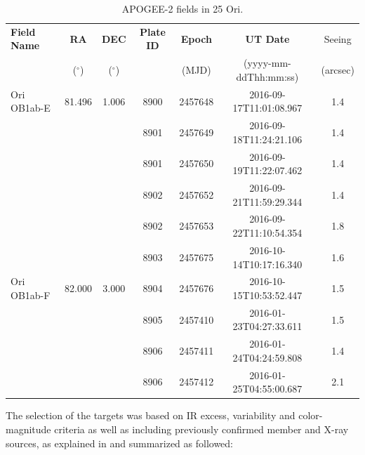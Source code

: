 \documentclass[12pt]{article}
\newcounter{subsubsubsection}[subsubsection]
\begin{document}
\begin{table} \tiny
\begin{center}
 \caption{APOGEE-2 fields in 25 Ori.}
 \label{tab:APOGEE-2_fields}
 \begin{threeparttable}
  	\setlength{\tabcolsep}{11pt}
	\begin{tabular}{lcccccc}
	\toprule
	{\bf Field Name} & {\bf RA}    & {\bf DEC}  & {\bf Plate ID} & {\bf Epoch} & {\bf UT Date}         & Seeing   \\
	                 & ($^\circ$) & ($^\circ$)  &                & (MJD)       & (yyyy-mm-ddThh:mm:ss) & (arcsec) \\
	\midrule
	Ori OB1ab-E & 81.496 & 1.006 & 8900 & 2457648 & 2016-09-17T11:01:08.967 & 1.4 \\
	            &        &       & 8901 & 2457649 & 2016-09-18T11:24:21.106 & 1.4 \\
	            &        &       & 8901 & 2457650 & 2016-09-19T11:22:07.462 & 1.4 \\
	            &        &       & 8902 & 2457652 & 2016-09-21T11:59:29.344 & 1.4 \\
	            &        &       & 8902 & 2457653 & 2016-09-22T11:10:54.354 & 1.8 \\
	            &        &       & 8903 & 2457675 & 2016-10-14T10:17:16.340 & 1.6 \\
	\midrule
	Ori OB1ab-F & 82.000 & 3.000 & 8904 & 2457676 & 2016-10-15T10:53:52.447 & 1.5 \\
	            &        &       & 8905 & 2457410 & 2016-01-23T04:27:33.611 & 1.5 \\
	            &        &       & 8906 & 2457411 & 2016-01-24T04:24:59.808 & 1.4 \\
	            &        &       & 8906 & 2457412 & 2016-01-25T04:55:00.687 & 2.1 \\
	\bottomrule
	\end{tabular}
 \end{threeparttable}
\end{center}
\end{table}

\label{sec_APOGEE-2:targets}
The selection of the targets was based on IR excess, variability and color-magnitude criteria as well as including previously confirmed member and X-ray sources, as explained in \citet{Cottle2018} and summarized as followed:
\end{document}
